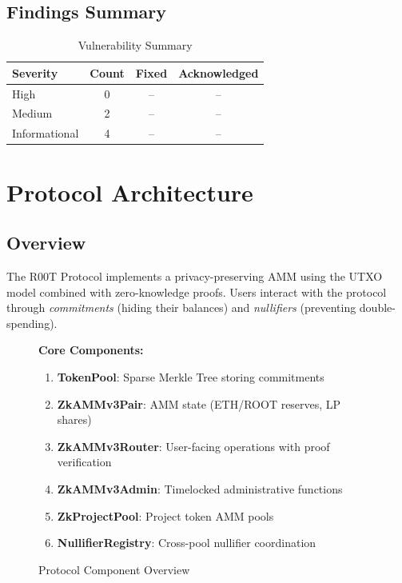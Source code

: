 \documentclass[12pt,a4paper]{article}
\begin{document}
\subsection{Findings Summary}

\begin{table}[h]
\centering
\begin{tabular}{lccc}
\toprule
\textbf{Severity} & \textbf{Count} & \textbf{Fixed} & \textbf{Acknowledged} \\
\midrule
\textcolor{highsev}{High} & 0 & -- & -- \\
\textcolor{medsev}{Medium} & 2 & -- & -- \\
Informational & 4 & -- & -- \\
\bottomrule
\end{tabular}
\caption{Vulnerability Summary}
\end{table}

\section{Protocol Architecture}

\subsection{Overview}

The R00T Protocol implements a privacy-preserving AMM using the UTXO model combined with zero-knowledge proofs. Users interact with the protocol through \textit{commitments} (hiding their balances) and \textit{nullifiers} (preventing double-spending).

\begin{figure}[h]
\centering
\begin{tcolorbox}[width=0.9\textwidth]
\textbf{Core Components:}
\begin{enumerate}[noitemsep]
    \item \textbf{TokenPool}: Sparse Merkle Tree storing commitments
    \item \textbf{ZkAMMv3Pair}: AMM state (ETH/ROOT reserves, LP shares)
    \item \textbf{ZkAMMv3Router}: User-facing operations with proof verification
    \item \textbf{ZkAMMv3Admin}: Timelocked administrative functions
    \item \textbf{ZkProjectPool}: Project token AMM pools
    \item \textbf{NullifierRegistry}: Cross-pool nullifier coordination
\end{enumerate}
\end{tcolorbox}
\caption{Protocol Component Overview}
\end{figure}
\end{document}
